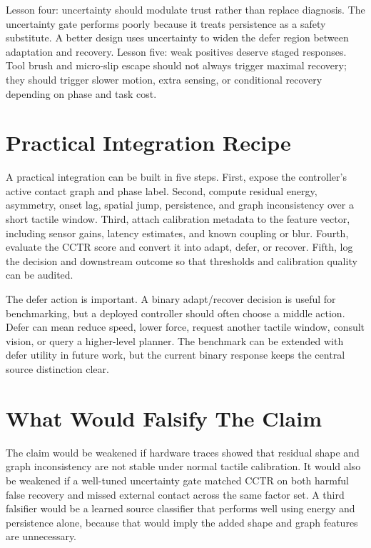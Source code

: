 \documentclass{article}
\newcommand{\method}{CCTR}
\begin{document}
Lesson four: uncertainty should modulate trust rather than replace diagnosis. The uncertainty gate performs poorly because it treats persistence as a safety substitute. A better design uses uncertainty to widen the defer region between adaptation and recovery. Lesson five: weak positives deserve staged responses. Tool brush and micro-slip escape should not always trigger maximal recovery; they should trigger slower motion, extra sensing, or conditional recovery depending on phase and task cost.

\section{Practical Integration Recipe}

A practical integration can be built in five steps. First, expose the controller's active contact graph and phase label. Second, compute residual energy, asymmetry, onset lag, spatial jump, persistence, and graph inconsistency over a short tactile window. Third, attach calibration metadata to the feature vector, including sensor gains, latency estimates, and known coupling or blur. Fourth, evaluate the \method{} score and convert it into adapt, defer, or recover. Fifth, log the decision and downstream outcome so that thresholds and calibration quality can be audited.

The defer action is important. A binary adapt/recover decision is useful for benchmarking, but a deployed controller should often choose a middle action. Defer can mean reduce speed, lower force, request another tactile window, consult vision, or query a higher-level planner. The benchmark can be extended with defer utility in future work, but the current binary response keeps the central source distinction clear.

\section{What Would Falsify The Claim}

The claim would be weakened if hardware traces showed that residual shape and graph inconsistency are not stable under normal tactile calibration. It would also be weakened if a well-tuned uncertainty gate matched \method{} on both harmful false recovery and missed external contact across the same factor set. A third falsifier would be a learned source classifier that performs well using energy and persistence alone, because that would imply the added shape and graph features are unnecessary.
\end{document}
